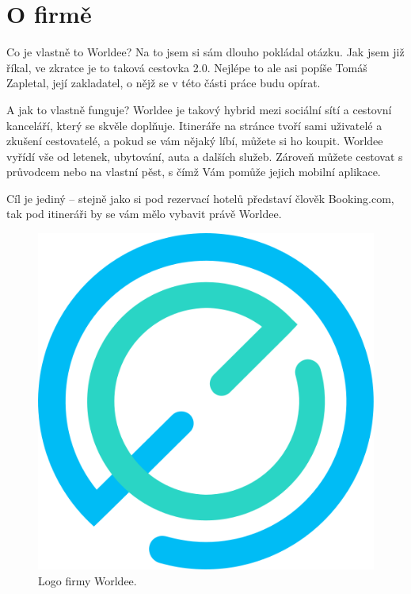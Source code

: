 \section{O firmě}

Co je vlastně to Worldee? Na to jsem si sám dlouho pokládal otázku. Jak jsem již říkal, ve zkratce je to taková cestovka 2.0. Nejlépe to ale asi popíše Tomáš Zapletal, její zakladatel, o nějž se v této části práce budu opírat.\cite{WorldeeInfo}

\begin{displayquote}
\end{displayquote}

A jak to vlastně funguje? Worldee je takový hybrid mezi sociální sítí a cestovní kanceláří, který se skvěle doplňuje. Itineráře na stránce tvoří sami uživatelé a zkušení cestovatelé, a pokud se vám nějaký líbí, můžete si ho koupit. Worldee vyřídí vše od letenek, ubytování, auta a dalších služeb. Zároveň můžete cestovat s průvodcem nebo na vlastní pěst, s čímž Vám pomůže jejich mobilní aplikace.

Cíl je jediný – stejně jako si pod rezervací hotelů představí člověk Booking.com, tak pod itineráři by se vám mělo vybavit právě Worldee.
\\
\begin{figure}[!h]
    \centering
    \includegraphics[width=0.3\linewidth]{obrazky/worldee.png}
    \caption[Logo firmy Worldee]{Logo firmy Worldee.\cite{Worldee}}
\end{figure}